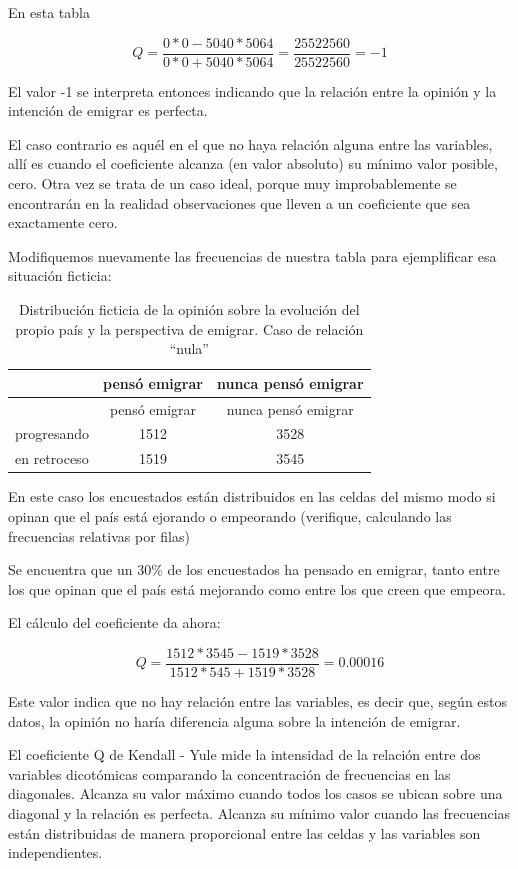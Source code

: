 \documentclass[]{book}
\begin{document}
En esta tabla

\[Q = \frac{0*0 - 5040*5064}{0*0+5040*5064} = \frac{25522560}{25522560} = -1\]

El valor -1 se interpreta entonces indicando que la relación entre la opinión y la intención de emigrar es perfecta.

El caso contrario es aquél en el que no haya relación alguna entre las
variables, allí es cuando el coeficiente alcanza (en valor absoluto) su mínimo valor posible, cero. Otra vez se trata de un caso ideal, porque muy improbablemente se encontrarán en la realidad observaciones que lleven a un coeficiente que sea exactamente cero.

Modifiquemos nuevamente las frecuencias de nuestra tabla para
ejemplificar esa situación ficticia:

\begin{longtable}[]{@{}lcc@{}}
\caption{\label{tab:unnamed-chunk-119}Distribución ficticia de la opinión sobre la evolución del propio país y la perspectiva de emigrar. Caso de relación ``nula''}\tabularnewline
\toprule
& pensó emigrar & nunca pensó emigrar\tabularnewline
\midrule
\endfirsthead
\toprule
& pensó emigrar & nunca pensó emigrar\tabularnewline
\midrule
\endhead
progresando & 1512 & 3528\tabularnewline
en retroceso & 1519 & 3545\tabularnewline
\bottomrule
\end{longtable}

En este caso los encuestados están distribuidos en las celdas del mismo modo si opinan que el país está ejorando o empeorando (verifique, calculando las frecuencias relativas por filas)

Se encuentra que un 30\% de los encuestados ha pensado en emigrar, tanto entre los que opinan que el país está mejorando como entre los que creen que empeora.

El cálculo del coeficiente da ahora:

\[Q = \frac{1512*3545-1519*3528}{1512*545+1519*3528} = 0.00016\]

Este valor indica que no hay relación entre las variables, es decir que, según estos datos, la opinión no haría diferencia alguna sobre la intención de emigrar.

El coeficiente Q de Kendall - Yule mide la intensidad de la relación
entre dos variables dicotómicas comparando la concentración de
frecuencias en las diagonales. Alcanza su valor máximo cuando todos los casos se ubican sobre una diagonal y la relación es perfecta. Alcanza su mínimo valor cuando las frecuencias están distribuidas de manera proporcional entre las celdas y las variables son independientes.
\end{document}
